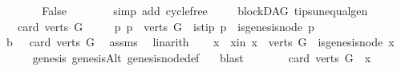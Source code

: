 \begin{isabellebody}
\ \ \ \ \isamarkupfalse%
\ \isamarkupfalse%
\ False\isanewline
\ \ \ \ \ \ \isamarkupfalse%
\ {\isacharparenleft}{\kern0pt}simp\ add{\isacharcolon}{\kern0pt}\ cycle{\isacharunderscore}{\kern0pt}free{\isacharparenright}{\kern0pt}\isanewline
\ \ \isamarkupfalse%
\isanewline
{}\isamarkupfalse%
%
\endisatagproof
{\isafoldproof}%
%
\isadelimproof
\isanewline
%
\endisadelimproof
\isanewline
\isanewline
{}\isamarkupfalse%
\ {\isacharparenleft}{\kern0pt}\ blockDAG{\isacharparenright}{\kern0pt}\ tips{\isacharunderscore}{\kern0pt}unequal{\isacharunderscore}{\kern0pt}gen{\isacharcolon}{\kern0pt}\isanewline
\ \ \ {\isachardoublequoteopen}card{\isacharparenleft}{\kern0pt}\ verts\ G{\isacharparenright}{\kern0pt}\ {\isachargreater}{\kern0pt}\ {}{\isachardoublequoteclose}\isanewline
\ \ \ {\isachardoublequoteopen}{\isasymexists}p{\isachardot}{\kern0pt}\ p\ {\isasymin}\ verts\ G\ {\isasymand}\ is{\isacharunderscore}{\kern0pt}tip\ p\ {\isasymand}\ {\isasymnot}is{\isacharunderscore}{\kern0pt}genesis{\isacharunderscore}{\kern0pt}node\ p\ {\isachardoublequoteclose}\isanewline
%
\isadelimproof
%
\endisadelimproof
%
\isatagproof
{}\isamarkupfalse%
\ {\isacharminus}{\kern0pt}\isanewline
\ \ \isamarkupfalse%
\ b{}{\isacharcolon}{\kern0pt}\ {\isachardoublequoteopen}{}\ {\isacharless}{\kern0pt}\ card\ {\isacharparenleft}{\kern0pt}verts\ G{\isacharparenright}{\kern0pt}{\isachardoublequoteclose}\ \isamarkupfalse%
\ assms\ \isamarkupfalse%
\ linarith\isanewline
\ \ \isamarkupfalse%
\ x\ \ x{\isacharunderscore}{\kern0pt}in{\isacharcolon}{\kern0pt}\ {\isachardoublequoteopen}x\ {\isasymin}\ {\isacharparenleft}{\kern0pt}verts\ G{\isacharparenright}{\kern0pt}\ {\isasymand}\ is{\isacharunderscore}{\kern0pt}genesis{\isacharunderscore}{\kern0pt}node\ x{\isachardoublequoteclose}\ \isanewline
\ \ \ \ \isamarkupfalse%
\ genesis\ genesisAlt\ genesis{\isacharunderscore}{\kern0pt}node{\isacharunderscore}{\kern0pt}def\ \ \isamarkupfalse%
\ blast\isanewline
\ \ \isamarkupfalse%
\ \isamarkupfalse%
\ {\isachardoublequoteopen}{}\ {\isacharless}{\kern0pt}\ card\ {\isacharparenleft}{\kern0pt}{\isacharparenleft}{\kern0pt}verts\ G{\isacharparenright}{\kern0pt}\ {\isacharminus}{\kern0pt}\ {\isacharbraceleft}{\kern0pt}x{\isacharbraceright}{\kern0pt}{\isacharparenright}{\kern0pt}{\isachardoublequoteclose}\ \isamarkupfalse%

\end{isabellebody}
